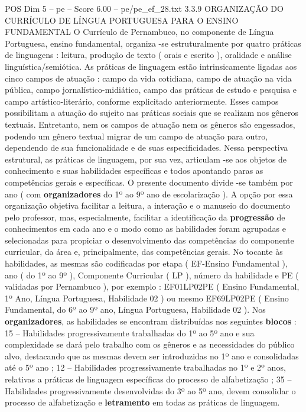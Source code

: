 \begin{textsample}{POS Dim 5 – pe – Score 6.00 – pe/pe\_ef\_28.txt}  \label{ex:f5_pos_202}
3.3.9 ORGANIZAÇÃO DO CURRÍCULO DE LÍNGUA PORTUGUESA PARA O ENSINO FUNDAMENTAL O Currículo de Pernambuco, no componente de Língua Portuguesa, ensino fundamental, organiza -se estruturalmente por quatro práticas de linguagens : leitura, produção de texto ( orais e escrito ), oralidade e análise linguística/semiótica.
As práticas de linguagem estão intrinsicamente ligadas aos cinco campos de atuação : campo da vida cotidiana, campo de atuação na vida pública, campo jornalístico-midiático, campo das práticas de estudo e pesquisa e campo artístico-literário, conforme explicitado anteriormente.
Esses campos possibilitam a atuação do sujeito nas práticas sociais que se realizam nos gêneros textuais.
Entretanto, nem os campos de atuação nem os gêneros são engessados, podendo um gênero textual migrar de um campo de atuação para outro, dependendo de sua funcionalidade e de suas especificidades.
Nessa perspectiva estrutural, as práticas de linguagem, por sua vez, articulam -se aos objetos de conhecimento e suas habilidades específicas e todos apontando paras as competências gerais e específicas.
O presente documento divide -se também por ano ( com \textbf{organizadores} do 1º ao 9º ano de escolarização ).
A opção por essa organização objetiva facilitar a leitura, a interação e o manuseio do documento pelo professor, mas, especialmente, facilitar a identificação da \textbf{progressão} de conhecimentos em cada ano e o modo como as habilidades foram agrupadas e selecionadas para propiciar o desenvolvimento das competências do componente curricular, da área e, principalmente, das competências gerais.
No tocante às habilidades, as mesmas são codificadas por etapa ( EF-Ensino Fundamental ), ano ( do 1º ao 9º ), Componente Curricular ( LP ), número da habilidade e PE ( validadas por Pernambuco ), por exemplo : EF01LP02PE ( Ensino Fundamental, 1º Ano, Língua Portuguesa, Habilidade 02 ) ou mesmo EF69LP02PE ( Ensino Fundamental, do 6º ao 9º ano, Língua Portuguesa, Habilidade 02 ).
Nos \textbf{organizadores}, as habilidades se encontram distribuídas nos seguintes \textbf{blocos} : 15 – Habilidades progressivamente trabalhadas do 1º ao 5º ano e sua complexidade se dará pelo trabalho com os gêneros e as necessidades do público alvo, destacando que as mesmas devem ser introduzidas no 1º ano e consolidadas até o 5º ano ; 12 – Habilidades progressivamente trabalhadas no 1º e 2º anos, relativas a práticas de linguagem específicas do processo de alfabetização ; 35 – Habilidades progressivamente desenvolvidas do 3º ao 5º ano, devem consolidar o processo de alfabetização e \textbf{letramento} em todas as práticas de linguagem.

\end{textsample}
